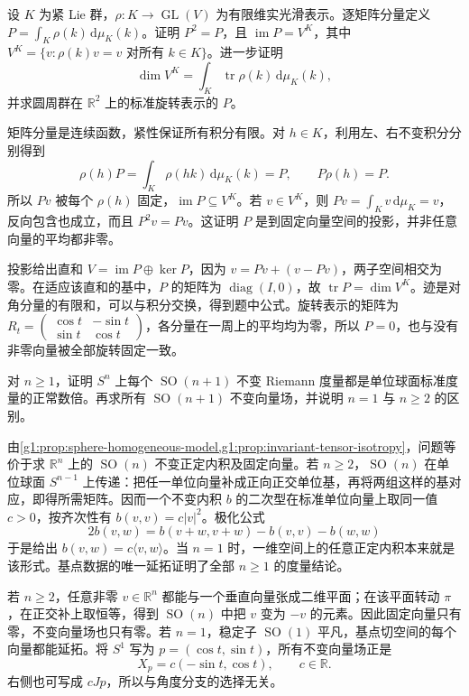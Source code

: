 \begin{exercise}\label{g1:ex:average-projection-fixed-vectors}
	设 \(K\) 为紧 Lie 群，\(\rho:K\to\operatorname{GL}(V)\) 为有限维实光滑表示。逐矩阵分量定义 \(P=\int_K\rho(k)\,\mathrm{d}\mu_K(k)\)。证明 \(P^2=P\)，且 \(\operatorname{im}P=V^K\)，其中 \(V^K=\{v:\rho(k)v=v\text{ 对所有 }k\in K\}\)。进一步证明
	\[
		\dim V^K=\int_K\operatorname{tr}\rho(k)\,\mathrm{d}\mu_K(k),
	\]
	并求圆周群在 \(\mathbb R^2\) 上的标准旋转表示的 \(P\)。
\end{exercise}
\begin{solution}
	矩阵分量是连续函数，紧性保证所有积分有限。对 \(h\in K\)，利用左、右不变积分分别得到
	\[
		\rho(h)P=\int_K\rho(hk)\,\mathrm{d}\mu_K(k)=P,
		\qquad P\rho(h)=P.
	\]
	所以 \(Pv\) 被每个 \(\rho(h)\) 固定，\(\operatorname{im}P\subseteq V^K\)。若 \(v\in V^K\)，则 \(Pv=\int_Kv\,\mathrm{d}\mu_K=v\)，反向包含也成立，而且 \(P^2v=Pv\)。这证明 \(P\) 是到固定向量空间的投影，并非任意向量的平均都非零。

	投影给出直和 \(V=\operatorname{im}P\oplus\ker P\)，因为 \(v=Pv+(v-Pv)\)，两子空间相交为零。在适应该直和的基中，\(P\) 的矩阵为 \(\operatorname{diag}(I,0)\)，故 \(\operatorname{tr}P=\dim V^K\)。迹是对角分量的有限和，可以与积分交换，得到题中公式。旋转表示的矩阵为 \(R_t=\left(\begin{smallmatrix}\cos t&-\sin t\\\sin t&\cos t\end{smallmatrix}\right)\)，各分量在一周上的平均均为零，所以 \(P=0\)，也与没有非零向量被全部旋转固定一致。
\end{solution}

\begin{exercise}\label{g1:ex:sphere-invariant-tensors}
	对 \(n\geq1\)，证明 \(S^n\) 上每个 \(\operatorname{SO}(n+1)\) 不变 Riemann 度量都是单位球面标准度量的正常数倍。再求所有 \(\operatorname{SO}(n+1)\) 不变向量场，并说明 \(n=1\) 与 \(n\geq2\) 的区别。
\end{exercise}
\begin{solution}
	由\cref{g1:prop:sphere-homogeneous-model,g1:prop:invariant-tensor-isotropy}，问题等价于求 \(\mathbb R^n\) 上的 \(\operatorname{SO}(n)\) 不变正定内积及固定向量。若 \(n\geq2\)，\(\operatorname{SO}(n)\) 在单位球面 \(S^{n-1}\) 上传递：把任一单位向量补成正向正交单位基，再将两组这样的基对应，即得所需矩阵。因而一个不变内积 \(b\) 的二次型在标准单位向量上取同一值 \(c>0\)，按齐次性有 \(b(v,v)=c|v|^2\)。极化公式
	\[
		2b(v,w)=b(v+w,v+w)-b(v,v)-b(w,w)
	\]
	于是给出 \(b(v,w)=c\langle v,w\rangle\)。当 \(n=1\) 时，一维空间上的任意正定内积本来就是该形式。基点数据的唯一延拓证明了全部 \(n\geq1\) 的度量结论。

	若 \(n\geq2\)，任意非零 \(v\in\mathbb R^n\) 都能与一个垂直向量张成二维平面；在该平面转动 \(\pi\)，在正交补上取恒等，得到 \(\operatorname{SO}(n)\) 中把 \(v\) 变为 \(-v\) 的元素。因此固定向量只有零，不变向量场也只有零。若 \(n=1\)，稳定子 \(\operatorname{SO}(1)\) 平凡，基点切空间的每个向量都能延拓。将 \(S^1\) 写为 \(p=(\cos t,\sin t)\)，所有不变向量场正是
	\[
		X_p=c(-\sin t,\cos t),\qquad c\in\mathbb R.
	\]
	右侧也可写成 \(cJp\)，所以与角度分支的选择无关。
\end{solution}


